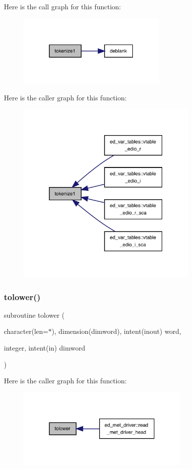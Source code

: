 Here is the call graph for this function\+:
\nopagebreak
\begin{figure}[H]
\begin{center}
\leavevmode
\includegraphics[width=208pt]{charutils_8f90_a4e0b5a3a2a3a429434a954e8af39d758_cgraph}
\end{center}
\end{figure}
Here is the caller graph for this function\+:
\nopagebreak
\begin{figure}[H]
\begin{center}
\leavevmode
\includegraphics[width=253pt]{charutils_8f90_a4e0b5a3a2a3a429434a954e8af39d758_icgraph}
\end{center}
\end{figure}
\mbox{\label{charutils_8f90_a2bd99695e205166c38b103139c05d3cf}} 
\subsubsection{\texorpdfstring{tolower()}{tolower()}}
{\footnotesize\ttfamily subroutine tolower (\begin{DoxyParamCaption}\item[{character(len=$\ast$), dimension(dimword), intent(inout)}]{word,  }\item[{integer, intent(in)}]{dimword }\end{DoxyParamCaption})}

Here is the caller graph for this function\+:
\nopagebreak
\begin{figure}[H]
\begin{center}
\leavevmode
\includegraphics[width=241pt]{charutils_8f90_a2bd99695e205166c38b103139c05d3cf_icgraph}
\end{center}
\end{figure}
